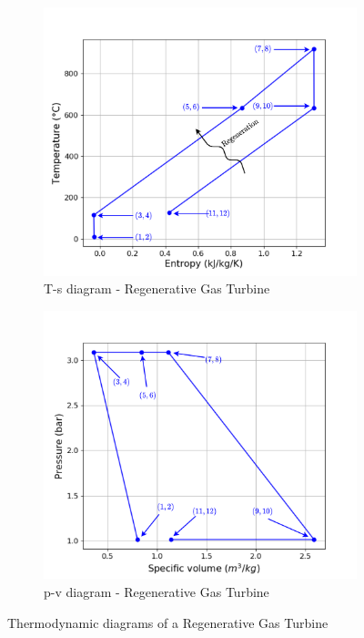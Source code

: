 \begin{figure}[h]
     \centering
     \begin{subfigure}[b]{0.4\textwidth}
         \centering
         \includegraphics[width=\textwidth]{Ts_RGT}
         \caption{T-s diagram - Regenerative Gas Turbine}
         \label{fig:C5_Ts_RGT}
     \end{subfigure}
     \begin{subfigure}[b]{0.4\textwidth}
         \centering
         \includegraphics[width=\textwidth]{pv_RGT}
         \caption{p-v diagram - Regenerative Gas Turbine}
         \label{fig:C5_pv_RGT}
     \end{subfigure}
        \caption{Thermodynamic diagrams of a Regenerative Gas Turbine}
        \label{fig:C5_thermo_diagram_RGT}
\end{figure}

